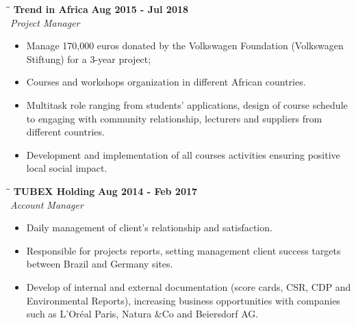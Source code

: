 \documentclass[margin]{res}
\begin{document}
\begin{resume}
\vspace{-0.1in}
    \begin{tabbing}
        \hspace{2.3in}\= \hspace{1.7in}\= \kill
        \textbf{Trend in Africa} \>\>\textbf{Aug 2015 - Jul 2018}\\
        \textit{Project Manager}\\        
    \end{tabbing}\vspace{-20pt}
    \vspace{2mm}
    \begin{itemize}
        \item Manage 170,000 euros donated by the Volkswagen Foundation (Volkswagen Stiftung) for a 3-year project;
        \item Courses and workshops organization in different African countries.
        \item Multitask role ranging from students’ applications, design of course schedule to engaging with community relationship, lecturers and suppliers from different countries.
        \item Development and implementation of all courses activities ensuring positive local social impact.
    \end{itemize}

\vspace{-0.1in}
    \begin{tabbing}
        \hspace{2.3in}\= \hspace{1.7in}\= \kill
        \textbf{TUBEX Holding} \>\>\textbf{Aug 2014 - Feb 2017}\\
        \textit{Account Manager}\\        
    \end{tabbing}\vspace{-20pt}
    \vspace{2mm}
    \begin{itemize}
        \item Daily management of client’s relationship and satisfaction.
        \item Responsible for projects reports, setting management client success targets between Brazil and Germany sites.
        \item Develop of internal and external documentation (score cards, CSR, CDP and Environmental Reports), increasing business opportunities with companies such as L’Oréal Paris, Natura \&Co and Beiersdorf AG.
    \end{itemize}    


\end{resume}
\end{document}
